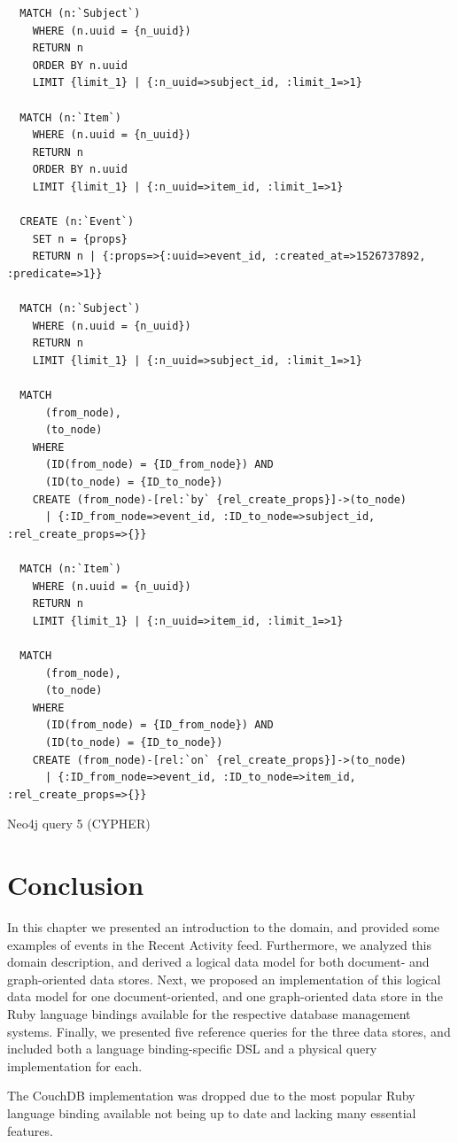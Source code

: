 \begin{listing}[H]
  \begin{verbatim}
  MATCH (n:`Subject`)
    WHERE (n.uuid = {n_uuid})
    RETURN n
    ORDER BY n.uuid
    LIMIT {limit_1} | {:n_uuid=>subject_id, :limit_1=>1}

  MATCH (n:`Item`)
    WHERE (n.uuid = {n_uuid})
    RETURN n
    ORDER BY n.uuid
    LIMIT {limit_1} | {:n_uuid=>item_id, :limit_1=>1}

  CREATE (n:`Event`)
    SET n = {props}
    RETURN n | {:props=>{:uuid=>event_id, :created_at=>1526737892, :predicate=>1}}

  MATCH (n:`Subject`)
    WHERE (n.uuid = {n_uuid})
    RETURN n
    LIMIT {limit_1} | {:n_uuid=>subject_id, :limit_1=>1}

  MATCH
      (from_node),
      (to_node)
    WHERE
      (ID(from_node) = {ID_from_node}) AND
      (ID(to_node) = {ID_to_node})
    CREATE (from_node)-[rel:`by` {rel_create_props}]->(to_node)
      | {:ID_from_node=>event_id, :ID_to_node=>subject_id, :rel_create_props=>{}}

  MATCH (n:`Item`)
    WHERE (n.uuid = {n_uuid})
    RETURN n
    LIMIT {limit_1} | {:n_uuid=>item_id, :limit_1=>1}

  MATCH
      (from_node),
      (to_node)
    WHERE
      (ID(from_node) = {ID_from_node}) AND
      (ID(to_node) = {ID_to_node})
    CREATE (from_node)-[rel:`on` {rel_create_props}]->(to_node)
      | {:ID_from_node=>event_id, :ID_to_node=>item_id, :rel_create_props=>{}}
  \end{verbatim}

  \caption{Neo4j query 5 (CYPHER)}
  \label{lst:neo4j-query-5-cypher}
\end{listing}

\clearpage{}

\section{Conclusion}
\label{sec:data-model-conclusion}

In this chapter we presented an introduction to the domain, and provided some examples of events in the Recent Activity feed.
Furthermore, we analyzed this domain description, and derived a logical data model for both document- and graph-oriented data stores.
Next, we proposed an implementation of this logical data model for one document-oriented, and one graph-oriented data store in the Ruby language bindings available for the respective database management systems.
Finally, we presented five reference queries for the three data stores, and included both a language binding-specific DSL and a physical query implementation for each.

The CouchDB implementation was dropped due to the most popular Ruby language binding available not being up to date and lacking many essential features.
